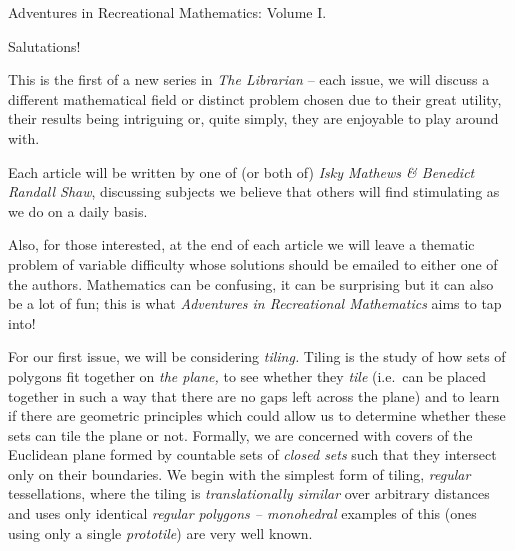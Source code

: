 Adventures in Recreational Mathematics: Volume I.

Salutations!

This is the first of a new series in \emph{The Librarian }-- each issue,
we will discuss a different mathematical field or distinct problem
chosen due to their great utility, their results being intriguing or,
quite simply, they are enjoyable to play around with.

Each article will be written by one of (or both of) \emph{Isky Mathews
\& Benedict Randall Shaw}, discussing subjects we believe that others
will find stimulating as we do on a daily basis.

Also, for those interested, at the end of each article we will leave a
thematic problem of variable difficulty whose solutions should be
emailed to either one of the authors. Mathematics can be confusing, it
can be surprising but it can also be a lot of fun; this is what
\emph{Adventures in Recreational Mathematics }aims to tap into!

For our first issue, we will be considering \emph{tiling. }Tiling is the
study of how sets of polygons fit together on \emph{the plane, }to see
whether they \emph{tile }(i.e.~can be placed together in such a way that
there are no gaps left across the plane) and to learn if there are
geometric principles which could allow us to determine whether these
sets can tile the plane or not. Formally, we are concerned with covers
of the Euclidean plane formed by countable sets of \emph{closed sets
}such that they intersect only on their boundaries. We begin with the
simplest form of tiling, \emph{regular }tessellations, where the tiling
is \emph{translationally similar }over arbitrary distances and uses only
identical \emph{regular polygons -- monohedral }examples of this (ones
using only a single \emph{prototile}) are very well known.

